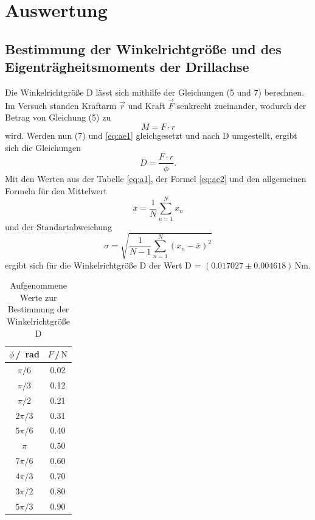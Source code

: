 \section{Auswertung}
\label{sec:Auswertung}


\subsection{Bestimmung der Winkelrichtgröße und des Eigenträgheitsmoments der Drillachse}

Die Winkelrichtgröße D lässt sich mithilfe der Gleichungen (5 und 7) berechnen. Im Versuch standen 
Kraftarm $\vec{r}$ und Kraft $\vec{F}$ senkrecht zueinander, wodurch der Betrag von Gleichung (5) 
zu
\begin{equation}
    M = F \cdot r
    \label{eq:ae1}
\end{equation}
\noindent
wird. Werden nun (7) und \ref{eq:ae1} gleichgesetzt und nach D umgestellt, ergibt sich die Gleichungen
\begin{equation}
    D = \frac{F\cdot r}{\phi}.
    \label{eq:ae2}
\end{equation}
\noindent
Mit den Werten aus der Tabelle \ref{eq:a1}, der Formel \ref{eq:ae2} und den allgemeinen Formeln für den Mittelwert
\begin{equation}
    \bar{x} = \frac{1}{N} \sum_{n=1}^N x_n 
    \label{eq:ae3}
\end{equation}
\noindent
und der Standartabweichung
\begin{equation}
    \sigma = \sqrt{\frac{1}{N-1} \sum_{n=1}^N (x_n - \bar{x})^2}
\end{equation}
\noindent
ergibt sich für die Winkelrichtgröße D der Wert D = $(0.017027 \pm 0.004618)\,$Nm.

\begin{table}[H]
\normalsize

\centering
{}
\begin{tabular}{c c}
\toprule
    $\phi$\,/\, rad & $F$\,/\,$\si{\newton}$ \\
    \midrule

$\pi/6$  &   0.02   \\
$\pi/3$  &   0.12   \\
$\pi/2$  &   0.21   \\
$2\pi/3$ &   0.31   \\
$5\pi/6$ &   0.40   \\
$\pi$    &   0.50   \\
$7\pi/6$ &   0.60   \\
$4\pi/3$ &   0.70   \\
$3\pi/2$ &   0.80   \\
$5\pi/3$ &   0.90   \\ 

    \bottomrule
\end{tabular}
\caption{Aufgenommene Werte zur Bestimmung der Winkelrichtgröße D}
\label{tab:a1}
\end{table}














